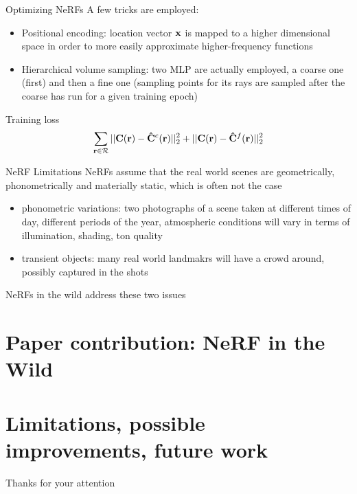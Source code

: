 \documentclass[aspectratio=1610]{beamer}
\begin{document}
\begin{frame}{Optimizing NeRFs}
    A few tricks are employed:
    \begin{itemize}
        \item Positional encoding: location vector \(\vb{x}\) is mapped to a higher dimensional space in order to more easily approximate higher-frequency functions
        \item Hierarchical volume sampling: two MLP are actually employed, a coarse one (first) and then a fine one (sampling points for its rays are sampled after the coarse has run for a given training epoch) 
    \end{itemize}
    \begin{block}{Training loss}
        \begin{equation}
            \sum_{\vb{r} \in \mathcal{R}} ||\vb{C}(\vb{r}) - \vb{\hat{C}}^c(\vb{r})||_2^2 + ||\vb{C}(\vb{r}) - \vb{\hat{C}}^f(\vb{r})||_2^2
        \end{equation}
    \end{block}
\end{frame}

\begin{frame}{NeRF Limitations}
    NeRFs assume that the real world scenes are geometrically, phonometrically and materially static, which is often not the case
    \begin{itemize}
        \item phonometric variations: two photographs of a scene taken at different times of day, different periods of the year, atmospheric conditions will vary in terms of illumination, shading, ton quality
        \item transient objects: many real world landmakrs will have a crowd around, possibly captured in the shots
    \end{itemize}
    NeRFs in the wild address these two issues
\end{frame}

\section{Paper contribution: NeRF in the Wild}
\begin{frame}{}

    

\end{frame}

\section{Limitations, possible improvements, future work}
\begin{frame}
    \begin{center}
        Thanks for your attention
    \end{center}
\end{frame}
\end{document}
